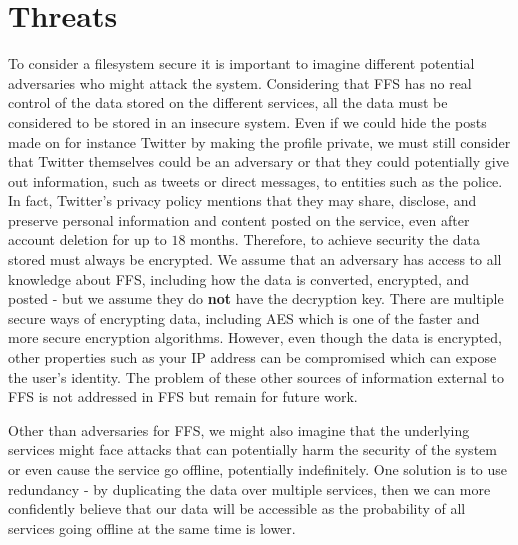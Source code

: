 \section{Threats}
To consider a filesystem secure it is important to imagine different potential adversaries who might attack the system. Considering that FFS has no real control of the data stored on the different services, all the data must be considered to be stored in an insecure system. Even if we could hide the posts made on for instance Twitter by making the profile private, we must still consider that Twitter themselves could be an adversary or that they could potentially give out information, such as tweets or direct messages, to entities such as the police. In fact, Twitter's privacy policy mentions that they may share, disclose, and preserve personal information and content posted on the service, even after account deletion for up to $18$ months\cite{TwitterPrivacyPolicy}. Therefore, to achieve security the data stored must always be encrypted. We assume that an adversary has access to all knowledge about FFS, including how the data is converted, encrypted, and posted - but we assume they do \textbf{not} have the decryption key. There are multiple secure ways of encrypting data, including AES which is one of the faster and more secure encryption algorithms\cite{mahajanStudyEncryptionAlgorithms2013}. However, even though the data is encrypted, other properties such as your IP address can be compromised which can expose the user's identity. The problem of these other sources of information external to FFS is not addressed in FFS but remain for future work.

Other than adversaries for FFS, we might also imagine that the underlying services might face attacks that can potentially harm the security of the system or even cause the service go offline, potentially indefinitely. One solution is to use redundancy - by duplicating the data over multiple services, then we can more confidently believe that our data will be accessible as the probability of all services going offline at the same time is lower.
